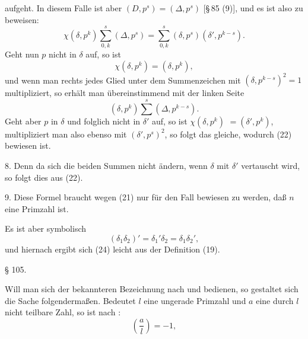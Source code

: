 aufgeht. In diesem Falle ist aber $(D, p^s) = (\Delta, p^s)$ [\S\,85 (9)],
und es ist also zu beweisen:
\[
\chi(\delta, p^k) \sum_{0,k}^{s} (\Delta, p^s) = \sum_{0,k}^{s} (\delta, p^s)(\delta', p^{k-s}).
\]
Geht nun $p$ nicht in $\delta$ auf, so ist
\[
\chi(\delta, p^k) = (\delta, p^k),
\]
und wenn man rechts jedes Glied unter dem Summenzeichen mit
$(\delta, p^{k-s})^2 = 1$ multipliziert, so erhält man übereinstimmend mit
der linken Seite
\[
(\delta, p^k) \overset{s}{\sum} (\Delta, p^{k-s}). %
\]
Geht aber $p$ in $\delta$ und folglich nicht in $\delta'$ auf, so ist $\chi(\delta, p^k)$
$= (\delta', p^k)$, multipliziert man also ebenso mit $(\delta', p^s)^2$, so folgt
das gleiche, wodurch (22) bewiesen ist.

8. 
Denn da sich die beiden Summen nicht ändern, wenn $\delta$ mit
$\delta'$ vertauscht wird, so folgt dies aus (22).

9. 
Diese Formel braucht wegen (21) nur für den Fall bewiesen
zu werden, daß $n$ eine Primzahl ist.

Es ist aber symbolisch
\[
(\delta_1\delta_2)' = \delta_1'\delta_2 = \delta_1\delta_2',
\]
und hiernach ergibt sich (24) leicht aus der Definition (19).

\begin{center}
§ 105.\quad {}
\end{center}

Will man sich der bekannteren Bezeichnung nach 
und  bedienen, so gestaltet sich die Sache folgendermaßen.
Bedeutet $l$ eine ungerade Primzahl und $a$ eine durch $l$ nicht
teilbare Zahl, so ist nach :
\[
\left(\frac{a}{l}\right) = -1,
\]

